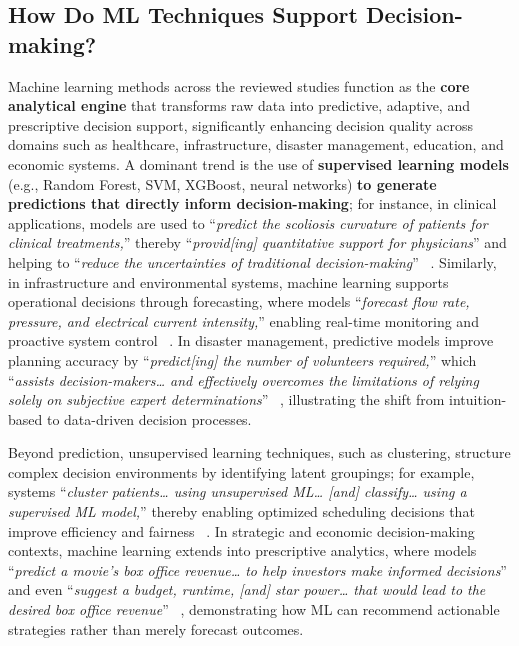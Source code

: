 \documentclass{sfuthesis}
\begin{document}
\subsection{How Do ML Techniques Support Decision-making?}
Machine learning methods across the reviewed studies function as the \textbf{core analytical engine} that transforms raw data into predictive, adaptive, and prescriptive decision support, significantly enhancing decision quality across domains such as healthcare, infrastructure, disaster management, education, and economic systems. A dominant trend is the use of\textbf{ supervised learning models} (e.g., Random Forest, SVM, XGBoost, neural networks) \textbf{to generate predictions that directly inform decision-making}; for instance, in clinical applications, models are used to “\textit{predict the scoliosis curvature of patients for clinical treatments,}” thereby “\textit{provid[ing] quantitative support for physicians}” and helping to “\textit{reduce the uncertainties of traditional decision-making}” ~\cite{Deng2017ScoliosisDSS}. Similarly, in infrastructure and environmental systems, machine learning supports operational decisions through forecasting, where models “\textit{forecast flow rate, pressure, and electrical current intensity,}” enabling real-time monitoring and proactive system control ~\cite{ataei2024intelligent}. In disaster management, predictive models improve planning accuracy by “\textit{predict[ing] the number of volunteers required,}” which “\textit{assists decision-makers… and effectively overcomes the limitations of relying solely on subjective expert determinations}” ~\cite{Chen2023TyphoonVolunteers}, illustrating the shift from intuition-based to data-driven decision processes.\par
Beyond prediction, unsupervised learning techniques, such as clustering, structure complex decision environments by identifying latent groupings; for example, systems “\textit{cluster patients… using unsupervised ML… [and] classify… using a supervised ML model,}” thereby enabling optimized scheduling decisions that improve efficiency and fairness ~\cite{feng2024adaptive}. In strategic and economic decision-making contexts, machine learning extends into prescriptive analytics, where models “\textit{predict a movie’s box office revenue… to help investors make informed decisions}” and even “\textit{suggest a budget, runtime, [and] star power… that would lead to the desired box office revenue}” ~\cite{leem2023towards}, demonstrating how ML can recommend actionable strategies rather than merely forecast outcomes.\par 
\end{document}
